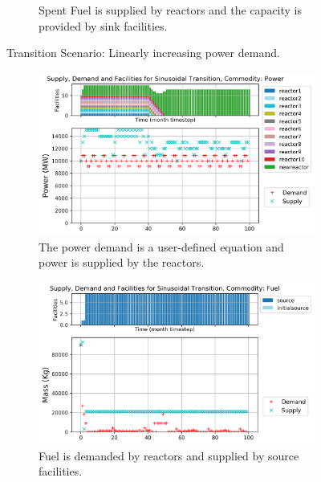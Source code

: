 \documentclass{anstrans}
\begin{document}
\begin{figure}[!htbp]
\begin{subfigure}[t]{0.65\textwidth}
        \caption{Spent Fuel is supplied by reactors and the capacity is provided by sink facilities.}
        \label{fig:growingtransition-spentfuel}
    \end{subfigure}
    \caption{Transition Scenario: Linearly increasing power demand.}
\end{figure}

\begin{figure}[!htbp]
    \centering
    \begin{subfigure}[t]{\textwidth}
    \centering
        \includegraphics[width=0.8\linewidth]{figures/sinetransition-power.png} 
        \caption{The power demand is a user-defined equation and power is supplied by the reactors.}
        \label{fig:sinetransition-power}
    \end{subfigure}
    \begin{subfigure}[t]{0.65\textwidth}
        \centering
        \includegraphics[width=\linewidth]{figures/sinetransition-fuel.png} 
        \caption{Fuel is demanded by reactors and supplied by source facilities.}
	    \label{fig:sinetransition-fuel}
    \end{subfigure}
    \begin{subfigure}[t]{0.65\textwidth}

\end{subfigure}
\end{figure}
\end{document}

